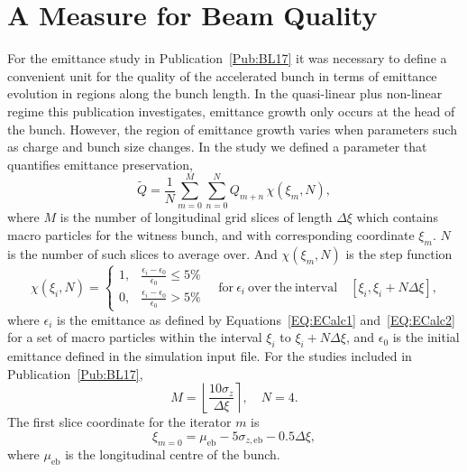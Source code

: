 \section{A Measure for Beam Quality}
\label{SimA:QTilde}

For the emittance study in Publication~\ref{Pub:BL17} it was necessary to define a convenient unit for the quality of the accelerated bunch in terms of emittance evolution in regions along the bunch length.
In the quasi-linear plus non-linear regime this publication investigates, emittance growth only occurs at the head of the bunch.
However, the region of emittance growth varies when parameters such as charge and bunch size changes.
In the study we defined a parameter that quantifies emittance preservation,
\begin{equation}
    \tilde{Q} = \frac{1}{N} \sum_{m=0}^{M} \sum_{n=0}^{N} Q_{m+n}\,\chi(\xi_{m},N),\label{EQ:BeamQ}
\end{equation}
where $M$ is the number of longitudinal grid slices of length $\Delta\xi$ which contains macro particles for the witness bunch, and with corresponding coordinate $\xi_{m}$.
$N$ is the number of such slices to average over.
And $\chi(\xi_{m},N)$ is the step function
\begin{equation}
    \chi(\xi_{i},N) =
    \begin{cases}
        1, & \frac{\epsilon_{i} - \epsilon_{0}}{\epsilon_{0}} \leq 5\% \\
        0, & \frac{\epsilon_{i} - \epsilon_{0}}{\epsilon_{0}} > 5\%
    \end{cases}
    \quad\mathrm{for~}\epsilon_{i}\mathrm{~over~the~interval}\quad
    [\xi_{i}, \xi_{i} + N\Delta\xi],
\end{equation}
where $\epsilon_{i}$ is the emittance as defined by Equations~\ref{EQ:ECalc1} and~\ref{EQ:ECalc2} for a set of macro particles within the interval $\xi_{i}$ to $\xi_{i} + N\Delta\xi$, and $\epsilon_{0}$ is the initial emittance defined in the simulation input file.
For the studies included in Publication~\ref{Pub:BL17},
\begin{equation}
    M = \left\lfloor \frac{10\sigma_{z}}{\Delta\xi} \right\rceil, \quad
    N = 4.
\end{equation}
The first slice coordinate for the iterator $m$ is
\begin{equation}
    \xi_{m=0} = \mu_{\mathrm{eb}} - 5\sigma_{z,\mathrm{eb}} - 0.5\Delta\xi,
\end{equation}
where $\mu_{\mathrm{eb}}$ is the longitudinal centre of the bunch.


